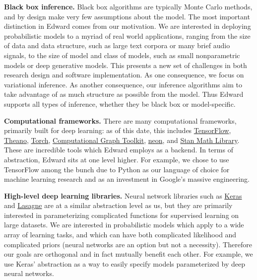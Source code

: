 \textbf{Black box inference.}
Black box algorithms are typically Monte Carlo methods, and
by design make very few assumptions about the model.
The most important distinction in Edward comes from our motivation.
We are interested in deploying probabilistic models to a myriad of
real world applications, ranging from the size of data and
data structure, such as large text corpora or many brief audio signals,
to the size of model and class of models, such as small nonparametric
models or deep generative models. This presents a new set of
challenges in both research design and software implementation.
As one consequence, we focus on variational inference.
As another consequence, our inference
algorithms aim to take advantage of as much structure as possible from
the model. Thus Edward supports all types of inference, whether they
be black box or model-specific.

\textbf{Computational frameworks.}
There are many computational frameworks, primarily built for deep
learning: as of this date, this includes
\href{https://www.tensorflow.org}{TensorFlow},
\href{http://deeplearning.net/software/theano/}{Theano},
\href{http://torch.ch}{Torch},
\href{http://rll.berkeley.edu/cgt/}{Computational Graph Toolkit},
\href{https://github.com/NervanaSystems/neon}{neon}, and
\href{https://github.com/stan-dev/math}{Stan Math Library}. These are
incredible tools which Edward employs as a backend. In
terms of abstraction, Edward sits at one level higher. For example,
we chose to use TensorFlow among the bunch due to Python as our language
of choice for machine learning research and as an investment in Google's
massive engineering.

\textbf{High-level deep learning libraries.}
Neural network libraries such as
\href{https://github.com/fchollet/keras}{Keras} and
\href{https://github.com/Lasagne/Lasagne}{Lasagne} are at a similar
abstraction level as us, but they are primarily interested in
parameterizing complicated functions for supervised learning on large
datasets. We are interested in probabilistic models which apply
to a wide array of learning tasks, and which can have both
complicated likelihood and complicated priors (neural networks are an
option but not a necessity). Therefore our goals are orthogonal and in
fact mutually benefit each other. For example, we use Keras'
abstraction as a way to easily specify models parameterized by deep
neural networks.
